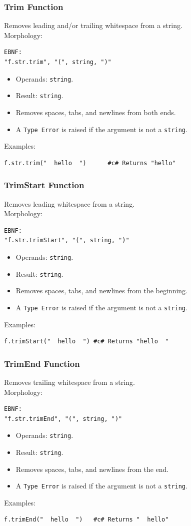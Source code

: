 \subsubsection{Trim Function}
Removes leading and/or trailing whitespace from a string. \\
Morphology:
\begin{verbatim}
EBNF:
"f.str.trim", "(", string, ")"
\end{verbatim}
\begin{itemize}
\item Operands: \texttt{string}.
\item Result: \texttt{string}.
\item Removes spaces, tabs, and newlines from both ends.
\item A \texttt{Type Error} is raised if the argument is not a \texttt{string}.
\end{itemize}
Examples:
\begin{verbatim}
f.str.trim("  hello  ")      #c# Returns "hello"
\end{verbatim}

\subsubsection{TrimStart Function}
Removes leading whitespace from a string. \\
Morphology:
\begin{verbatim}
EBNF:
"f.str.trimStart", "(", string, ")"
\end{verbatim}
\begin{itemize}
\item Operands: \texttt{string}.
\item Result: \texttt{string}.
\item Removes spaces, tabs, and newlines from the beginning.
\item A \texttt{Type Error} is raised if the argument is not a \texttt{string}.
\end{itemize}
Examples:
\begin{verbatim}
f.trimStart("  hello  ") #c# Returns "hello  "
\end{verbatim}

\subsubsection{TrimEnd Function}
Removes trailing whitespace from a string. \\
Morphology:
\begin{verbatim}
EBNF:
"f.str.trimEnd", "(", string, ")"
\end{verbatim}
\begin{itemize}
\item Operands: \texttt{string}.
\item Result: \texttt{string}.
\item Removes spaces, tabs, and newlines from the end.
\item A \texttt{Type Error} is raised if the argument is not a \texttt{string}.
\end{itemize}
Examples:
\begin{verbatim}
f.trimEnd("  hello  ")   #c# Returns "  hello"
\end{verbatim}

